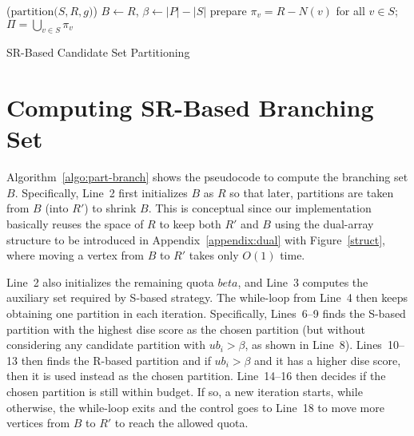 \documentclass[sigconf, nonacm]{acmart}
\begin{document}
\begin{algorithm}[!t]
  \DontPrintSemicolon
  \Begin($\text{partition}{(}S, R, g{)}$){
    $B\gets R$, $\beta\gets |P|-|S|$\;
    prepare $\pi_v = R-N(v)$ for all $v\in S$;\ \ $\Pi=\bigcup_{v\in S}\pi_v$\;
    \;
  }
\caption{SR-Based Candidate Set Partitioning}    
\label{algo:part-branch}
\end{algorithm}

\section{Computing SR-Based Branching Set}\label{appendix:sr_part} 

Algorithm~\ref{algo:part-branch} shows the pseudocode to compute the branching set $B$. Specifically, Line~2 first initializes $B$ as $R$ so that later, partitions are taken from $B$ (into $R'$) to shrink $B$. This is conceptual since our implementation basically reuses the space of $R$ to keep both $R'$ and $B$ using the dual-array structure to be introduced in Appendix~\ref{appendix:dual} with Figure~\ref{struct}, where moving a vertex from $B$ to $R'$ takes only $O(1)$ time.

Line~2 also initializes the remaining quota $beta$, and Line~3 computes the auxiliary set required by S-based strategy. The while-loop from Line~4 then keeps obtaining one partition in each iteration. Specifically, Lines~6--9 finds the S-based partition with the highest dise score as the chosen partition (but without considering any candidate partition with $ub_i>\beta$, as shown in Line~8). 
Lines~10--13 then finds the R-based partition and if $ub_i>\beta$ and it has a higher dise score, then it is used instead as the chosen partition. 
Line~14--16 then decides if the chosen partition is still within budget. If so, a new iteration starts, while otherwise, the while-loop exits and the control goes to Line~18 to move more vertices from $B$ to $R'$ to reach the allowed quota.
\end{document}
